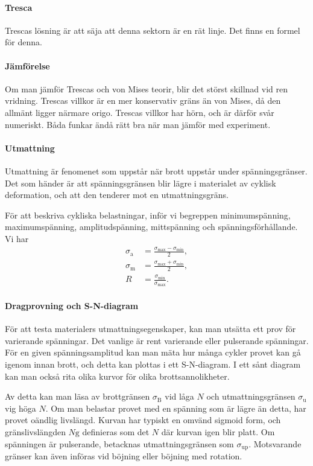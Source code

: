 \paragraph{Tresca}
Trescas lösning är att säja att denna sektorn är en rät linje. Det finns en formel för denna.

\paragraph{Jämförelse}
Om man jämför Trescas och von Mises teorir, blir det störst skillnad vid ren vridning. Trescas villkor är en mer konservativ gräns än von Mises, då den allmänt ligger närmare origo. Trescas villkor har hörn, och är därför svår numeriskt. Båda funkar ändå rätt bra när man jämför med experiment.

\paragraph{Utmattning}
Utmattning är fenomenet som uppstår när brott uppstår under spänningsgränser. Det som händer är att spänningsgränsen blir lägre i materialet av cyklisk deformation, och att den tenderer mot en utmattningsgräns.

För att beskriva cykliska belastningar, inför vi begreppen minimumspänning, maximumspänning, amplitudspänning, mittspänning och spänningsförhållande. Vi har
\begin{align*}
	\sigma_{\text{a}} &= \frac{\sigma_{\text{max}} - \sigma_{\text{min}}}{2}, \\
	\sigma_{\text{m}} &= \frac{\sigma_{\text{max}} + \sigma_{\text{min}}}{2}, \\
	R                 &= \frac{\sigma_{\text{min}}}{\sigma_{\text{max}}}.
\end{align*}

\paragraph{Dragprovning och S-N-diagram}
För att testa materialers utmattningsegenskaper, kan man utsätta ett prov för varierande spänningar. Det vanlige är rent varierande eller pulserande spänningar. För en given spänningsamplitud kan man mäta hur många cykler provet kan gå igenom innan brott, och detta kan plottas i ett S-N-diagram. I ett sånt diagram kan man också rita olika kurvor för olika brottsannolikheter.

Av detta kan man läsa av brottgränsen $\sigma_{\text{B}}$ vid låga $N$ och utmattningsgränsen $\sigma_{\text{u}}$ vig höga $N$. Om man belastar provet med en spänning som är lägre än detta, har provet oändlig livslängd. Kurvan har typiskt en omvänd sigmoid form, och gränslivslängden $N{\text{g}}$ definieras som det $N$ där kurvan igen blir platt. Om spänningen är pulserande, betacknas utmattningsgränsen som $\sigma_{\text{up}}$. Motsvarande gränser kan även införas vid böjning eller böjning med rotation.

